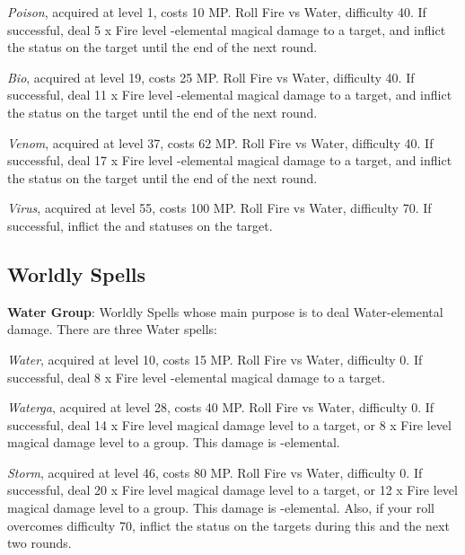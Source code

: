\begin{multicols}{2}
    \textit{Poison}, acquired at level 1, costs 10 MP\@. Roll Fire vs Water, difficulty 40. If successful, deal 5 x Fire level -elemental magical damage to a target, and inflict the  status on the target until the end of the next round.
    
    \textit{Bio}, acquired at level 19, costs 25 MP\@. Roll Fire vs Water, difficulty 40. If successful, deal 11 x Fire level -elemental magical damage to a target, and inflict the  status on the target until the end of the next round.
    
    \textit{Venom}, acquired at level 37, costs 62 MP\@. Roll Fire vs Water, difficulty 40. If successful, deal 17 x Fire level -elemental magical damage to a target, and inflict the  status on the target until the end of the next round.
    
    \textit{Virus}, acquired at level 55, costs 100 MP\@. Roll Fire vs Water, difficulty 70. If successful, inflict the  and  statuses on the target.

    \subsection{Worldly Spells}\label{subsec:black-worldly}

    \textbf{Water Group}: Worldly Spells whose main purpose is to deal Water-elemental damage. There are three Water spells:
    
    \textit{Water}, acquired at level 10, costs 15 MP\@. Roll Fire vs Water, difficulty 0. If successful, deal 8 x Fire level -elemental magical damage to a target.
    
    \textit{Waterga}, acquired at level 28, costs 40 MP\@. Roll Fire vs Water, difficulty 0. If successful, deal 14 x Fire level magical damage level to a target, or 8 x Fire level magical damage level to a group. This damage is -elemental.
    
    \textit{Storm}, acquired at level 46, costs 80 MP\@. Roll Fire vs Water, difficulty 0. If successful, deal 20 x Fire level magical damage level to a target, or 12 x Fire level magical damage level to a group. This damage is -elemental. Also, if your roll overcomes difficulty 70, inflict the  status on the targets during this and the next two rounds.

    \ffcrystal[type=level,height=8pt]


\end{multicols}
